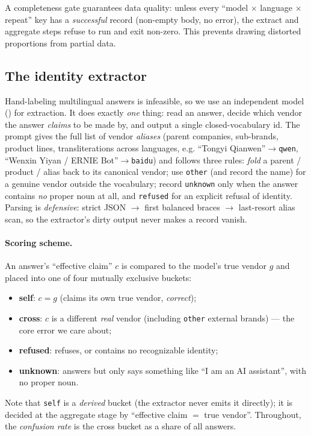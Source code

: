 \documentclass[11pt]{article}
\begin{document}
\noindent A completeness gate guarantees data quality: unless every ``model $\times$
language $\times$ repeat'' key has a \emph{successful} record (non-empty body, no error),
the extract and aggregate steps refuse to run and exit non-zero. This prevents drawing
distorted proportions from partial data.

\subsection{The identity extractor}\label{sec:extractor}
Hand-labeling \statTotal{} multilingual answers is infeasible, so we use an independent
model () for extraction. It does exactly \emph{one} thing: read an answer,
decide which vendor the answer \emph{claims} to be made by, and output a single
closed-vocabulary id. The prompt gives the full list of vendor \emph{aliases} (parent
companies, sub-brands, product lines, transliterations across languages, e.g.
``Tongyi Qianwen''$\to$\texttt{qwen}, ``Wenxin Yiyan / ERNIE Bot''$\to$\texttt{baidu}) and
follows three rules:
\emph{fold} a parent / product / alias back to its canonical vendor; use \texttt{other}
(and record the name) for a genuine vendor outside the vocabulary; record \texttt{unknown}
only when the answer contains \emph{no} proper noun at all, and \texttt{refused} for an
explicit refusal of identity. Parsing is \emph{defensive}: strict JSON $\to$ first
balanced braces $\to$ last-resort alias scan, so the extractor's dirty output never makes
a record vanish.

\paragraph{Scoring scheme.}\label{sec:scoring}
An answer's ``effective claim'' $c$ is compared to the model's true vendor $g$ and placed
into one of four mutually exclusive buckets:
\begin{itemize}
  \item \textbf{self}: $c = g$ (claims its own true vendor, \emph{correct});
  \item \textbf{cross}: $c$ is a different \emph{real} vendor (including \texttt{other}
  external brands) --- the core error we care about;
  \item \textbf{refused}: refuses, or contains no recognizable identity;
  \item \textbf{unknown}: answers but only says something like ``I am an AI assistant'',
  with no proper noun.
\end{itemize}
Note that \texttt{self} is a \emph{derived} bucket (the extractor never emits it directly);
it is decided at the aggregate stage by ``effective claim $=$ true vendor''. Throughout, the
\emph{confusion rate} is the cross bucket as a share of all answers.
\end{document}

